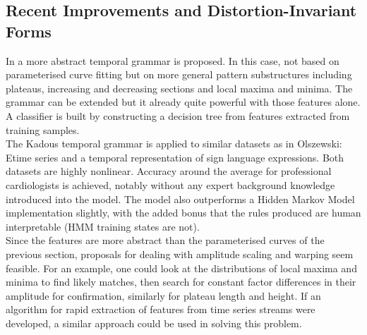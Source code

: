 	\subsection{Recent Improvements and Distortion-Invariant Forms}
	In \citep{kadous2005classification} a more abstract temporal grammar is proposed. In this case, not based on parameterised curve fitting but on more general pattern substructures including plateaus, increasing and decreasing sections and local maxima and minima. The grammar can be extended but it already quite powerful with those features alone. A classifier is built by constructing a decision tree from features extracted from training samples.
	\\
	The Kadous temporal grammar is applied to similar datasets as in Olszewski: Etime series and a temporal representation of sign language expressions.  Both datasets are highly nonlinear. Accuracy around the average for professional cardiologists is achieved, notably without any expert background knowledge introduced into the model. The model also outperforms a Hidden Markov Model implementation slightly, with the added bonus that the rules produced are human interpretable (HMM training states are not). 
	\\
	Since the features are more abstract than the parameterised curves of the previous section, proposals for dealing with amplitude scaling and warping seem feasible. For an example, one could look at the distributions of local maxima and minima to find likely matches, then search for constant factor differences in their amplitude for confirmation, similarly for plateau length and height. If an algorithm for rapid extraction of features from time series streams were developed, a similar approach could be used in solving this problem.
	
